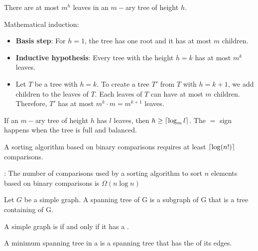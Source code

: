                 \par There are at most $m^{h}$ leaves in an $m-$ary tree of height $h$.
                \par Mathematical induction:
                \begin{itemize}
                    \item \textbf{Basis step}: For $h = 1$, the tree has one root and it has at
                        most $m$ children.
                    \item \textbf{Inductive hypothesis}: Every tree with the height $h = k$ has
                        at most $m^{k}$ leaves.
                    \item Let $T$ be a tree with $h = k$. To create a tree $T'$ from $T$ with
                        $h = k + 1$, we add children to the leaves of $T$. Each leaves of $T$ can
                        have at most $m$ children. Therefore, $T'$ has at most
                        $m^{k} \cdot m = m^{k + 1}$ leaves.
                \end{itemize}
                \par If an $m-$ary tree of height $h$ has $l$ leaves, then $h \geq \lceil \log_{m}l \rceil$.
                The $=$ sign happens when the tree is full and balanced.
    \hiiEND

            \par A sorting algorithm based on binary comparisons requires at least 
            $\lceil \log(n!) \rceil$ comparisons.
            \par {}: The number of comparisons used by a sorting algorithm
            to sort $n$ elements based on binary comparisons is $\Omega(n\log n)$
    \hiiEND


        \par Let $G$ be a simple graph. A spanning tree of G is a subgraph of G that is a
        tree containing  of G.
        \par A simple graph is  if and only if it has a .

        \par A minimum spanning tree in a  is a
        spanning tree that has the  of its edges.
